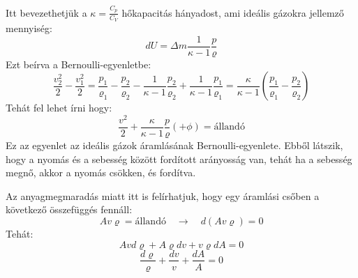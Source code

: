 \documentclass[a4paper,12pt]{article}
\begin{document}
Itt bevezethetjük a $\kappa = \frac{C_p}{C_V}$ hőkapacitás hányadost, ami ideális gázokra jellemző mennyiség:
\begin{equation}
    dU = \Delta m \frac{1}{\kappa - 1} \frac{p}{\varrho}
\end{equation}
Ezt beírva a Bernoulli-egyenletbe:
\begin{equation}
    \frac{v_2^2}{2} - \frac{v_1^2}{2} = \frac{p_1}{\varrho_1} - \frac{p_2}{\varrho_2} - \frac{1}{\kappa - 1} \frac{p_2}{\varrho_2} + \frac{1}{\kappa - 1} \frac{p_1}{\varrho_1} = \frac{\kappa}{\kappa - 1} \left(\frac{p_1}{\varrho_1} - \frac{p_2}{\varrho_2}\right)
\end{equation}
Tehát fel lehet írni hogy:
\begin{equation}
\frac{v^2}{2} + \frac{\kappa}{\kappa - 1} \frac{p}{\varrho} \left(+ \phi\right)= \text{állandó}
\end{equation}
Ez az egyenlet az ideális gázok áramlásának Bernoulli-egyenlete. Ebből látszik, hogy a nyomás és a sebesség között fordított arányosság van, tehát ha a sebesség megnő,
akkor a nyomás csökken, és fordítva.


Az anyagmegmaradás miatt itt is felírhatjuk, hogy egy áramlási csőben a következő összefüggés fennáll:
\begin{equation}
    A v \varrho = \text{állandó} \quad \rightarrow \quad d(A v \varrho) = 0
\end{equation}
Tehát:
\begin{equation}
    A v d\varrho + A \varrho dv + v \varrho dA = 0
\end{equation}
\begin{equation}
    \frac{d\varrho}{\varrho} + \frac{dv}{v} + \frac{dA}{A} = 0
\end{equation}
\end{document}
